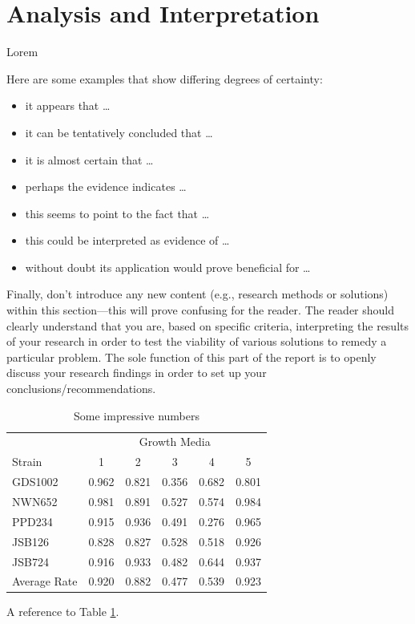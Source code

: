 \documentclass[peerreview]{IEEEtran}
\begin{document}
\section{Analysis and Interpretation}
Lorem

Here are some examples that show differing degrees of certainty:
\begin{itemize}
\item it appears that \ldots
\item it can be tentatively concluded that \ldots
\item it is almost certain that \ldots
\item perhaps the evidence indicates \ldots
\item this seems to point to the fact that \ldots
\item this could be interpreted as evidence of \ldots
\item without doubt its application would prove beneficial for \ldots
\end{itemize}

Finally, don’t introduce any new content (e.g., research methods or solutions) within this section---this will prove confusing for the reader. The reader should clearly understand that you are, based on specific criteria, interpreting the results of your research in order to test the viability of various solutions to remedy a particular problem. The sole function of this part of the report is to openly discuss your research findings in order to set up your conclusions/recommendations.

\begin{table}
\centering
\begin{tabular}{l c c c c c}
\toprule
& \multicolumn{5}{c}{Growth Media} \\
\cmidrule(l){2-6}
Strain & 1 & 2 & 3 & 4 & 5\\ %
\midrule %
GDS1002 & 0.962 & 0.821 & 0.356 & 0.682 & 0.801\\ %
NWN652 & 0.981 & 0.891 & 0.527 & 0.574 & 0.984\\ %
PPD234 & 0.915 & 0.936 & 0.491 & 0.276 & 0.965\\ %
JSB126 & 0.828 & 0.827 & 0.528 & 0.518 & 0.926\\ %
JSB724 & 0.916 & 0.933 & 0.482 & 0.644 & 0.937\\ %
\midrule %
\midrule %
Average Rate & 0.920 & 0.882 & 0.477 & 0.539 & 0.923\\ %
\bottomrule %
\end{tabular}
\smallskip
\caption{Some impressive numbers} %
\label{tab:template} %
\end{table}
A reference to Table \ref{tab:template}.
\end{document}
